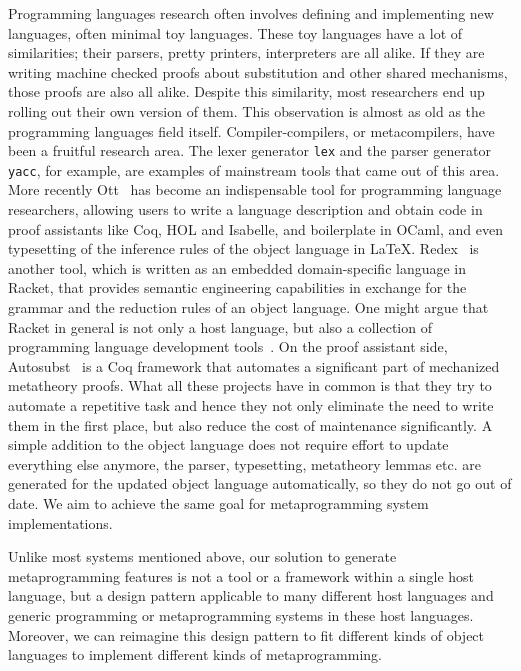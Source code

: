\documentclass[acmsmall, review=false, screen]{acmart}
\begin{document}
Programming languages research often involves defining and implementing new languages, often minimal toy languages. These toy languages have a lot of similarities; their parsers, pretty printers, interpreters are all alike. If they are writing machine checked proofs about substitution and other shared mechanisms, those proofs are also all alike. Despite this similarity, most researchers end up rolling out their own version of them. This observation is almost as old as the programming languages field itself. Compiler-compilers, or metacompilers, have been a fruitful research area. The lexer generator \texttt{lex} and the parser generator \texttt{yacc}, for example, are examples of mainstream tools that came out of this area. More recently Ott~\cite{ott} has become an indispensable tool for programming language researchers, allowing users to write a language description and obtain code in proof assistants like Coq, HOL and Isabelle, and boilerplate in OCaml, and even typesetting of the inference rules of the object language in \LaTeX.
Redex~\cite{redex} is another tool, which is written as an embedded domain-specific language in Racket, that provides semantic engineering capabilities in exchange for the grammar and the reduction rules of an object language. One might argue that Racket in general is not only a host language, but also a collection of programming language development tools~\cite{racketManifesto}. 
On the proof assistant side, Autosubst~\cite{autosubst1, autosubst2} is a Coq framework that automates a significant part of mechanized metatheory proofs. What all these projects have in common is that they try to automate a repetitive task and hence they not only eliminate the need to write them in the first place, but also reduce the cost of maintenance significantly. A simple addition to the object language does not require effort to update everything else anymore, the parser, typesetting, metatheory lemmas etc. are generated for the updated object language automatically, so they do not go out of date. We aim to achieve the same goal for metaprogramming system implementations.

Unlike most systems mentioned above, our solution to generate metaprogramming features is not a tool or a framework within a single host language, but a design pattern applicable to many different host languages and generic programming or metaprogramming systems in these host languages. Moreover, we can reimagine this design pattern to fit different kinds of object languages to implement different kinds of metaprogramming.






\end{document}
